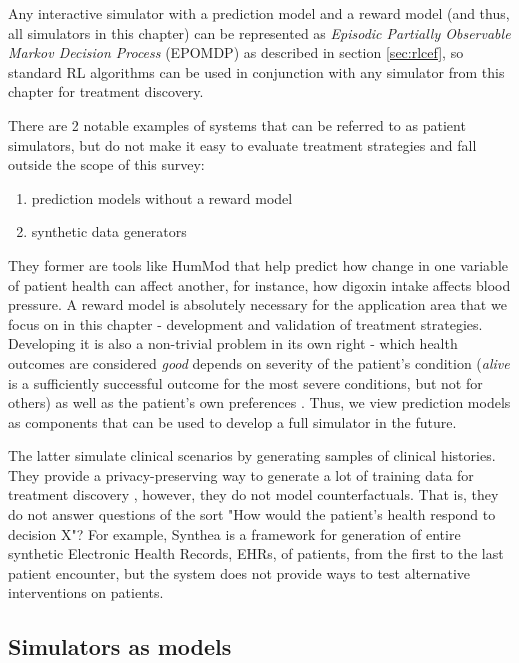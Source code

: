Any interactive simulator with a prediction model and a reward model (and thus, all simulators in this chapter) can be represented as {\em Episodic Partially Observable Markov Decision Process} (EPOMDP) as described in section \ref{sec:rlcef}, so standard RL algorithms can be used in conjunction with any simulator from this chapter for treatment discovery.

There are 2 notable examples of systems that can be referred to as patient simulators, but do not make it easy to evaluate treatment strategies and fall outside the scope of this survey:
\begin{enumerate}
    \item prediction models without a reward model
    \item synthetic data generators \cite{datagens}
\end{enumerate}

They former are tools like HumMod \cite{hummod} that help predict how change in one variable of patient health can affect another, for instance, how digoxin intake affects blood pressure.
A reward model is absolutely necessary for the application area that we focus on in this chapter - development and validation of treatment strategies.
Developing it is also a non-trivial problem in its own right - which health outcomes are considered \emph{good} depends on severity of the patient's condition (\emph{alive} is a sufficiently successful outcome for the most severe conditions, but not for others) as well as the patient's own preferences \cite{patpreferences1,muhlbacherPatientPreferencesPhysicians2013}.
Thus, we view prediction models as components that can be used to develop a full simulator in the future.

The latter simulate clinical scenarios by generating samples of clinical histories.
They provide a privacy-preserving way to generate a lot of training data for treatment discovery \cite{privacy1,privacy2,privacy3,privacy4}, however, they do not model counterfactuals. That is, they do not answer questions of the sort "How would the patient's health respond to decision X"? For example, Synthea \cite{synthea} is a framework for generation of entire synthetic Electronic Health Records, EHRs, of patients, from the first to the last patient encounter, but the system does not provide ways to test alternative interventions on patients.

\subsection{Simulators as models}

